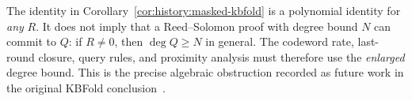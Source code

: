 \begin{remark}
The identity in Corollary~\ref{cor:history:masked-kbfold} is a polynomial identity for \emph{any} $R$. It does not imply that a Reed--Solomon proof with degree bound $N$ can commit to $Q$: if $R\neq0$, then $\deg Q\geq N$ in general. The codeword rate, last-round closure, query rules, and proximity analysis must therefore use the \emph{enlarged} degree bound. This is the precise algebraic obstruction recorded as future work in the original KBFold conclusion~\cite{MkhidaKBFold2026}.
\end{remark}
